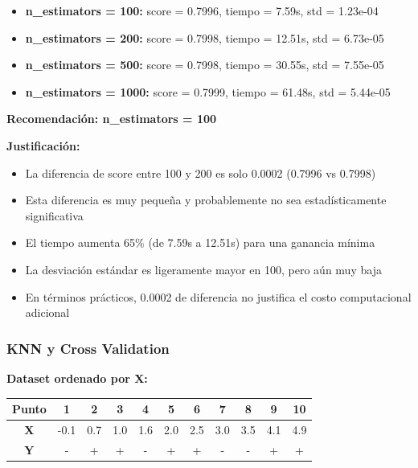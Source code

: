 \documentclass[12pt]{article}
\begin{document}
\begin{itemize}
    \item \textbf{n\_estimators = 100:} score = 0.7996, tiempo = 7.59s, std = 1.23e-04
    \item \textbf{n\_estimators = 200:} score = 0.7998, tiempo = 12.51s, std = 6.73e-05
    \item \textbf{n\_estimators = 500:} score = 0.7998, tiempo = 30.55s, std = 7.55e-05
    \item \textbf{n\_estimators = 1000:} score = 0.7999, tiempo = 61.48s, std = 5.44e-05
\end{itemize}

\textbf{Recomendación: n\_estimators = 100}

\vspace{1em}

\textbf{Justificación:}
\begin{itemize}
    \item La diferencia de score entre 100 y 200 es solo 0.0002 (0.7996 vs 0.7998)
    \item Esta diferencia es muy pequeña y probablemente no sea estadísticamente significativa
    \item El tiempo aumenta 65\% (de 7.59s a 12.51s) para una ganancia mínima
    \item La desviación estándar es ligeramente mayor en 100, pero aún muy baja
    \item En términos prácticos, 0.0002 de diferencia no justifica el costo computacional adicional
\end{itemize}

\subsubsection{KNN y Cross Validation}

\textbf{Dataset ordenado por X:}
\begin{table}[H]
    \centering
    \begin{tabular}{|c|c|c|c|c|c|c|c|c|c|c|}
        \hline
        \textbf{Punto} & 1 & 2 & 3 & 4 & 5 & 6 & 7 & 8 & 9 & 10 \\
        \hline
        \textbf{X} & -0.1 & 0.7 & 1.0 & 1.6 & 2.0 & 2.5 & 3.0 & 3.5 & 4.1 & 4.9 \\
        \hline
        \textbf{Y} & - & + & + & - & + & + & - & - & + & + \\
        \hline
    \end{tabular}
\end{table}
\end{document}
